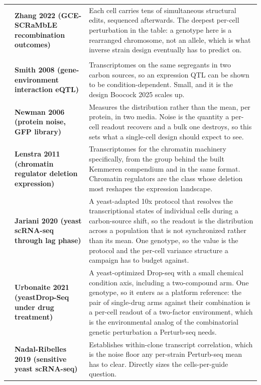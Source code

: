 \begin{longtable}{@{}r@{\hspace{4pt}} L{46mm} L{112mm}@{}}
 & \textbf{Zhang 2022 (GCE-SCRaMbLE recombination outcomes)} & Each cell carries tens of simultaneous structural edits, sequenced afterwards. The deepest per-cell perturbation in the table: a genotype here is a rearranged chromosome, not an allele, which is what inverse strain design eventually has to predict on. \\
\addlinespace[5pt]
\addlinespace[4pt]
\\
 & \textbf{Smith 2008 (gene-environment interaction eQTL)} & Transcriptomes on the same segregants in two carbon sources, so an expression QTL can be shown to be condition-dependent. Small, and it is the design Boocock 2025 scales up. \\
 & \textbf{Newman 2006 (protein noise, GFP library)} & Measures the distribution rather than the mean, per protein, in two media. Noise is the quantity a per-cell readout recovers and a bulk one destroys, so this sets what a single-cell design should expect to see. \\
 & \textbf{Lenstra 2011 (chromatin regulator deletion expression)} & Transcriptomes for the chromatin machinery specifically, from the group behind the built Kemmeren compendium and in the same format. Chromatin regulators are the class whose deletion most reshapes the expression landscape. \\
 & \textbf{Jariani 2020 (yeast scRNA-seq through lag phase)} & A yeast-adapted 10x protocol that resolves the transcriptional states of individual cells during a carbon-source shift, so the readout is the distribution across a population that is not synchronized rather than its mean. One genotype, so the value is the protocol and the per-cell variance structure a campaign has to budget against. \\
 & \textbf{Urbonaite 2021 (yeastDrop-Seq under drug treatment)} & A yeast-optimized Drop-seq with a small chemical condition axis, including a two-compound arm. One genotype, so it enters as a platform reference: the pair of single-drug arms against their combination is a per-cell readout of a two-factor environment, which is the environmental analog of the combinatorial genetic perturbation a Perturb-seq needs. \\
 & \textbf{Nadal-Ribelles 2019 (sensitive yeast scRNA-seq)} & Establishes within-clone transcript correlation, which is the noise floor any per-strain Perturb-seq mean has to clear. Directly sizes the cells-per-guide question. \\

\end{longtable}
